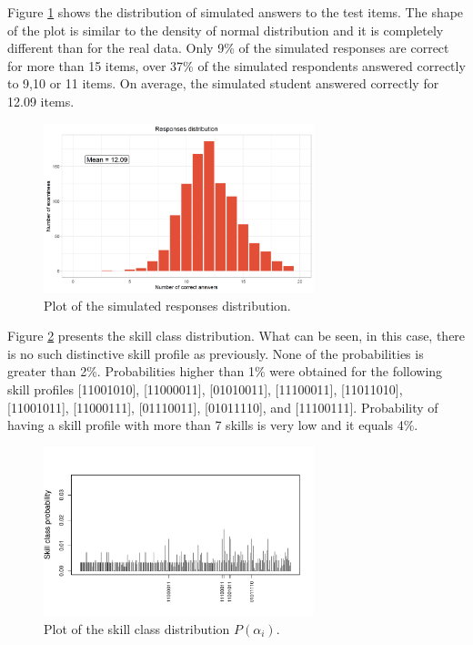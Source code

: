 \documentclass[english]{pwr_wmat_praca_dyplomowa}
\theoremstyle{plain}
\theoremstyle{definition}
\numberwithin{theorem}{chapter}
\begin{document}
Figure \ref{histogram_ans_sim} shows the distribution of simulated answers to the test items. The shape of the plot is similar to the density of normal distribution and it is completely different than for the real data. Only 9\% of the simulated responses are correct for more than 15 items, over 37\% of the simulated respondents answered correctly to 9,10 or 11 items. On average, the simulated student answered correctly for 12.09 items.

\begin{figure}[h!]
	\centering
	\includegraphics[width=0.7\textwidth]{Responses_sim_distribution.png}
	\caption{Plot of the simulated responses distribution.}
	\label{histogram_ans_sim}
\end{figure}

Figure \ref{skill_class_dist_sim} presents the skill class distribution. What can be seen, in this case, there is no such distinctive skill profile as previously. None of the probabilities is greater than 2\%. Probabilities higher than 1\% were obtained for the following skill profiles [11001010], [11000011], [01010011], [11100011], [11011010], [11001011], [11000111], [01110011], [01011110], and [11100111]. Probability of having a skill profile with more than 7 skills is very low and it equals 4\%.

\begin{figure}[h!]
	\centering
	\includegraphics[width=0.7\textwidth]{Skill_class_probability_sim.pdf}
	\caption{Plot of the skill class distribution $P(\alpha_i)$.}
	\label{skill_class_dist_sim}
\end{figure}
\end{document}
